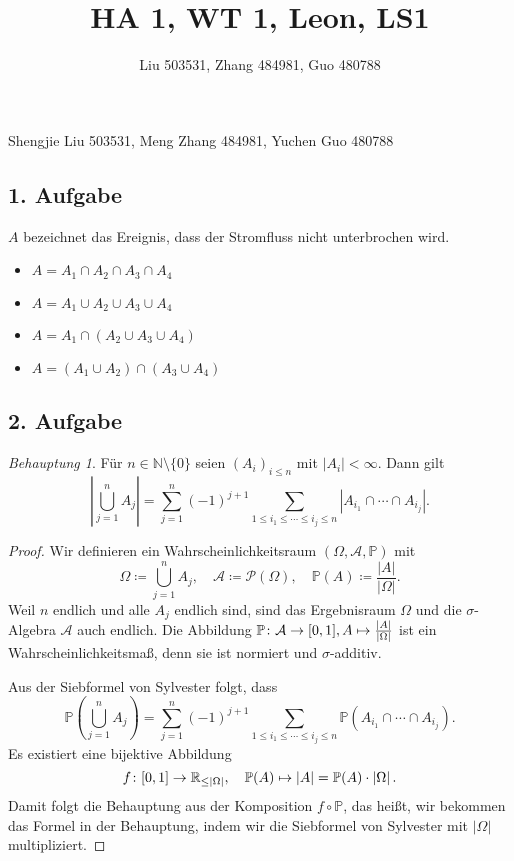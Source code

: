 \documentclass[fleqn,draft,a5paper]{article}
\title{HA 1, WT 1, Leon, LS1}
\author{Liu 503531, Zhang 484981, Guo 480788}
\providecommand{\abs}[1]{\left\lvert#1\right\rvert}
\theoremstyle{remark}
\newtheorem*{Behauptung}{Behauptung}
\begin{document}
\maketitle
\begin{center}
  Shengjie Liu 503531, Meng Zhang 484981, Yuchen Guo 480788
\end{center}
\newpage
\subsection{1. Aufgabe}
\(A\) bezeichnet das Ereignis, dass der Stromfluss nicht unterbrochen
wird.
\begin{itemize}
\item \(A = A_{1} \cap A_{2} \cap A_{3} \cap A_{4}\)
\item \(A = A_{1} \cup A_{2} \cup A_{3} \cup A_{4}\)
\item \(A = A_{1} \cap (A_{2} \cup A_{3} \cup A_{4})\)
\item \(A = (A_{1} \cup A_{2}) \cap (A_{3} \cup A_{4})\)
\end{itemize}
\subsection{2. Aufgabe}
\begin{Behauptung}
  Für \(n \in \mathbb{N} \setminus \{0\}\) seien \((A_{i})_{i \le n}\) mit \(\abs{A_{i}} < \infty\).
  Dann gilt
  \[\abs{\bigcup_{j=1}^{n}{A_{j}}}=\sum_{j=1}^{n}{(-1)^{j+1}} \sum_{1 \le i_{1} \le
      \cdots \le i_{j} \le n}{\abs{A_{i_{1}} \cap \cdots \cap A_{i_{j}}}}.\]
\end{Behauptung}
\begin{proof}
  Wir definieren ein Wahrscheinlichkeitsraum \((\Omega, \mathcal{A}, \mathbb{P})\) mit
  \[\Omega \coloneq \bigcup_{j=1}^{n}{A_{j}}, \quad \mathcal{A} \coloneq \mathcal{P}(\Omega), \quad \mathbb{P}(A) \coloneq
    \frac{\abs{A}}{\abs{\Omega}}.\]
  Weil \(n\) endlich und alle \(A_{j}\) endlich sind, sind das Ergebnisraum
  \(\Omega\) und die \(\sigma\)-Algebra \(\mathcal{A}\) auch endlich.
  Die Abbildung \(\mathbb{P}\colon \mathcal{A} \to \interval{0}{1}, A \mapsto \frac{\abs{A}}{\abs{\Omega}}\)
  ist ein Wahrscheinlichkeitsmaß, denn sie ist normiert und
  \(\sigma\)-additiv.

 Aus der Siebformel von Sylvester folgt, dass
  \[\mathbb{P}\left(\bigcup_{j=1}^{n}{A_{j}}\right) = \sum_{j=1}^{n}{(-1)^{j+1}} \sum_{1 \le i_{1} \le
      \cdots \le i_{j} \le n}{\mathbb{P}{(A_{i_{1}} \cap \cdots \cap A_{i_{j}})}}.\]
  Es existiert eine bijektive Abbildung
  \[f\colon \interval{0}{1} \to \mathbb{R}_{\le \abs{\Omega}}, \quad \mathbb{P}(A) \mapsto \abs{A} = \mathbb{P}(A) \cdot
    \abs{\Omega}.\]
  Damit folgt die Behauptung aus der Komposition \(f \circ \mathbb{P}\), das heißt,
  wir bekommen das Formel in der Behauptung, indem wir die Siebformel
  von Sylvester mit \(\abs{\Omega}\) multipliziert.
\end{proof}
\end{document}
